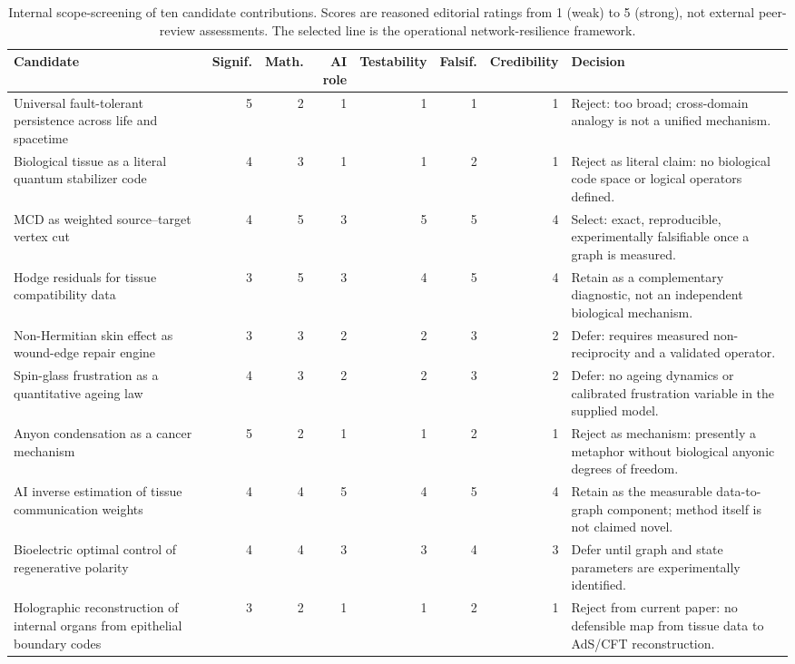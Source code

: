 \documentclass[12pt,a4paper]{article}
\begin{document}
\begin{table}[H]
\centering\scriptsize
\caption{Internal scope-screening of ten candidate contributions. Scores are reasoned editorial ratings from 1 (weak) to 5 (strong), not external peer-review assessments. The selected line is the operational network-resilience framework.}\label{tab:candidates}
\begin{tabularx}{\textwidth}{p{}rrrrrrX}
\toprule
Candidate & Signif. & Math. & AI role & Testability & Falsif. & Credibility & Decision\\
\midrule
Universal fault-tolerant persistence across life and spacetime & 5 & 2 & 1 & 1 & 1 & 1 & Reject: too broad; cross-domain analogy is not a unified mechanism.\\
Biological tissue as a literal quantum stabilizer code & 4 & 3 & 1 & 1 & 2 & 1 & Reject as literal claim: no biological code space or logical operators defined.\\
MCD as weighted source--target vertex cut & 4 & 5 & 3 & 5 & 5 & 4 & Select: exact, reproducible, experimentally falsifiable once a graph is measured.\\
Hodge residuals for tissue compatibility data & 3 & 5 & 3 & 4 & 5 & 4 & Retain as a complementary diagnostic, not an independent biological mechanism.\\
Non-Hermitian skin effect as wound-edge repair engine & 3 & 3 & 2 & 2 & 3 & 2 & Defer: requires measured non-reciprocity and a validated operator.\\
Spin-glass frustration as a quantitative ageing law & 4 & 3 & 2 & 2 & 3 & 2 & Defer: no ageing dynamics or calibrated frustration variable in the supplied model.\\
Anyon condensation as a cancer mechanism & 5 & 2 & 1 & 1 & 2 & 1 & Reject as mechanism: presently a metaphor without biological anyonic degrees of freedom.\\
AI inverse estimation of tissue communication weights & 4 & 4 & 5 & 4 & 5 & 4 & Retain as the measurable data-to-graph component; method itself is not claimed novel.\\
Bioelectric optimal control of regenerative polarity & 4 & 4 & 3 & 3 & 4 & 3 & Defer until graph and state parameters are experimentally identified.\\
Holographic reconstruction of internal organs from epithelial boundary codes & 3 & 2 & 1 & 1 & 2 & 1 & Reject from current paper: no defensible map from tissue data to AdS/CFT reconstruction.\\
\bottomrule
\end{tabularx}
\end{table}
\end{document}
